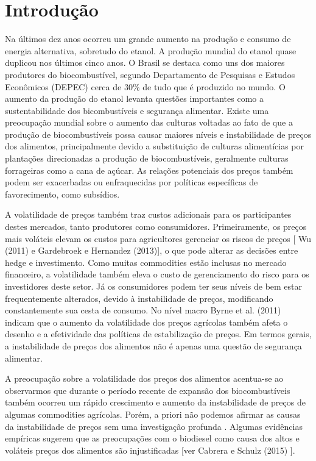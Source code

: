 \documentclass[a4paper,12pt] {article}
\begin{document}
	
	\section{Introdução}


Na últimos dez anos ocorreu um grande aumento na produção e consumo de energia alternativa, sobretudo do etanol. A produção mundial do etanol quase duplicou nos últimos cinco anos. O Brasil se destaca como uns dos maiores produtores do  biocombustível, segundo Departamento de Pesquisas e Estudos Econômicos (DEPEC) cerca de 30\%  de tudo que é produzido no mundo. O aumento da produção do etanol levanta questões importantes como a sustentabilidade dos bicombustíveis e  segurança alimentar. Existe uma preocupação mundial sobre o aumento das culturas voltadas ao fato de que a produção de biocombustíveis possa causar  maiores níveis e  instabilidade de preços dos alimentos, principalmente devido a substituição de culturas alimentícias por  plantações direcionadas a produção de biocombustíveis, geralmente culturas forrageiras como a cana de açúcar.   As relações potenciais dos preços também podem ser exacerbadas ou enfraquecidas por políticas específicas de favorecimento, como subsídios.

A volatilidade de preços também traz custos adicionais para os participantes destes  mercados, tanto produtores como consumidores. Primeiramente, os preços mais  voláteis  elevam os custos para agricultores gerenciar os riscos de preços [ Wu (2011) e Gardebroek e Hernandez (2013)], o que pode alterar as decisões entre hedge e investimento. Como muitas commodities estão inclusas no mercado financeiro, a volatilidade  também eleva o custo de gerenciamento do risco para os investidores deste setor.  Já os consumidores podem ter seus níveis de bem estar frequentemente alterados, devido à instabilidade de preços, modificando constantemente sua cesta de consumo. No nível macro Byrne et al. (2011) indicam que o aumento da volatilidade dos preços agrícolas também afeta o desenho e a efetividade das políticas de estabilização de preços. Em termos gerais, a instabilidade de preços dos alimentos não é apenas uma questão de segurança alimentar. 

 A preocupação sobre a volatilidade dos preços dos alimentos acentua-se ao observarmos que durante o período recente de  expansão dos biocombustíveis também ocorreu um rápido crescimento e aumento da instabilidade de preços  de algumas commodities agrícolas. Porém, a priori não podemos afirmar as causas da instabilidade de preços sem uma investigação profunda . Algumas evidências empíricas sugerem que as preocupações com o biodiesel como causa dos altos e voláteis  preços dos alimentos são injustificadas [ver  Cabrera e Schulz (2015) ].
 
\end{document}
